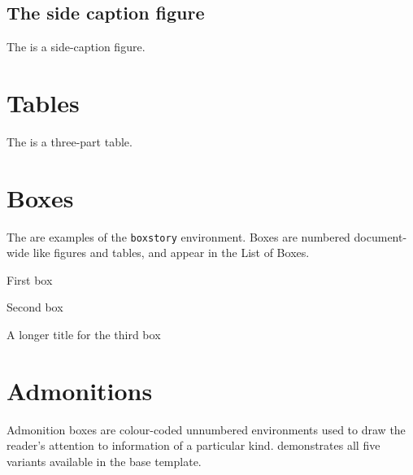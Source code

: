 \lipsum[1-3]

\subsection{The side caption figure} \label{sec:sidefig}

The  is a side-caption figure. \lipsum[1-3]



\lipsum[1-3]

\section{Tables}

The  is a three-part table. \lipsum[1]



\lipsum[3]

\section{Boxes} \label{sec:boxes}

The  are examples of the
\texttt{boxstory} environment. Boxes are numbered document-wide
like figures and tables, and appear in the List of Boxes.

\lipsum[1]

\begin{boxstory}{First box}
\label{box:first}
\lipsum[1]
\end{boxstory}

\lipsum[1-2]

\begin{boxstory}{Second box}
\label{box:second}
\lipsum[1-6]
\end{boxstory}

\lipsum[1]

\begin{boxstory}{A longer title for the third box}
\label{box:third}
\lipsum[3]
\end{boxstory}

\lipsum[1-2]

\section{Admonitions} \label{sec:admonitions}

Admonition boxes are colour-coded unnumbered environments used to
draw the reader's attention to information of a particular kind.
 demonstrates all five variants available
in the base template.


